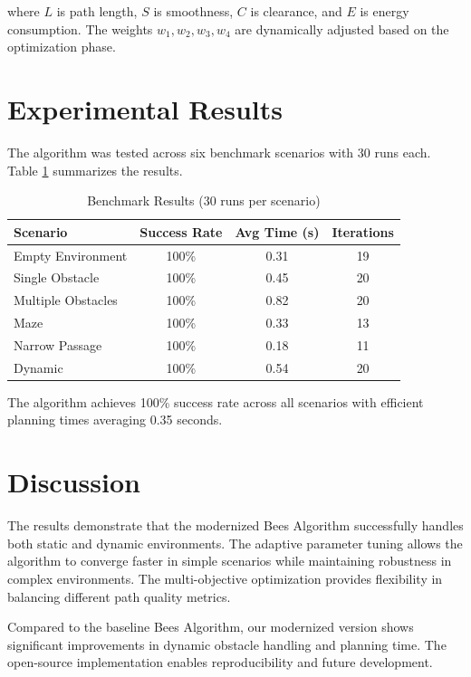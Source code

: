 \documentclass[12pt]{article}
\begin{document}
where $L$ is path length, $S$ is smoothness, $C$ is clearance, and $E$ is energy consumption. The weights $w_1, w_2, w_3, w_4$ are dynamically adjusted based on the optimization phase.

\section{Experimental Results}

The algorithm was tested across six benchmark scenarios with 30 runs each. Table \ref{tab:results} summarizes the results.

\begin{table}[h!]
\caption{Benchmark Results (30 runs per scenario)}
\label{tab:results}
\begin{center}
\begin{tabular}{|l|c|c|c|}
\hline
Scenario & Success Rate & Avg Time (s) & Iterations \\
\hline
Empty Environment & 100\% & 0.31 & 19 \\
Single Obstacle & 100\% & 0.45 & 20 \\
Multiple Obstacles & 100\% & 0.82 & 20 \\
Maze & 100\% & 0.33 & 13 \\
Narrow Passage & 100\% & 0.18 & 11 \\
Dynamic & 100\% & 0.54 & 20 \\
\hline
\end{tabular}
\end{center}
\end{table}

The algorithm achieves 100\% success rate across all scenarios with efficient planning times averaging 0.35 seconds.

\section{Discussion}

The results demonstrate that the modernized Bees Algorithm successfully handles both static and dynamic environments. The adaptive parameter tuning allows the algorithm to converge faster in simple scenarios while maintaining robustness in complex environments. The multi-objective optimization provides flexibility in balancing different path quality metrics.

Compared to the baseline Bees Algorithm, our modernized version shows significant improvements in dynamic obstacle handling and planning time. The open-source implementation enables reproducibility and future development.
\end{document}
